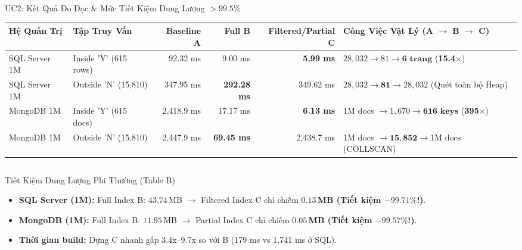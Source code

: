 \documentclass[aspectratio=169,9pt]{beamer}
\begin{document}
\begin{frame}{UC2: Kết Quả Đo Đạc \& Mức Tiết Kiệm Dung Lượng $>99.5\%$}
\begin{table}
\centering\footnotesize
\begin{tabularx}{\linewidth}{@{}l l r r r X@{}}
\toprule
\textbf{Hệ Quản Trị} & \textbf{Tập Truy Vấn} & \textbf{Baseline A} & \textbf{Full B} & \textbf{Filtered/Partial C} & \textbf{Công Việc Vật Lý (A $\to$ B $\to$ C)} \\
\midrule
SQL Server 1M & Inside 'Y' (615 rows) & 92.32 ms & 9.00 ms & \textbf{5.99 ms} & $28,032 \to 81 \to \mathbf{6\text{ trang}}$ (\textbf{15.4$\times$}) \\
SQL Server 1M & Outside 'N' (15,810) & 347.95 ms & \textbf{292.28 ms} & 349.62 ms & $28,032 \to \mathbf{81} \to 28,032$ (Quét toàn bộ Heap) \\
\midrule
MongoDB 1M & Inside 'Y' (615 docs) & 2,418.9 ms & 17.17 ms & \textbf{6.13 ms} & 1M docs $\to 1,670 \to \mathbf{616\text{ keys}}$ (\textbf{395$\times$}) \\
MongoDB 1M & Outside 'N' (15,810) & 2,447.9 ms & \textbf{69.45 ms} & 2,438.7 ms & 1M docs $\to \mathbf{15,852} \to 1\text{M docs}$ (COLLSCAN) \\
\bottomrule
\end{tabularx}
\end{table}

\vspace{-0.2cm}
\begin{columns}[T]
\begin{column}{0.48\textwidth}
\begin{exampleblock}{Tiết Kiệm Dung Lượng Phi Thường (Table B)}
\scriptsize
\begin{itemize}
  \item \textbf{SQL Server (1M):} Full Index B: $43.74$\,MB $\to$ Filtered Index C chỉ chiếm \textbf{$0.13$\,MB (Tiết kiệm $-99.71\%$!)}.
  \item \textbf{MongoDB (1M):} Full Index B: $11.95$\,MB $\to$ Partial Index C chỉ chiếm \textbf{$0.05$\,MB (Tiết kiệm $-99.57\%$!)}.
  \item \textbf{Thời gian build:} Dựng C nhanh gấp 3.4x--9.7x so với B (179 ms vs 1,741 ms ở SQL).
\end{itemize}
\end{exampleblock}
\end{column}


\end{columns}
\end{frame}
\end{document}
